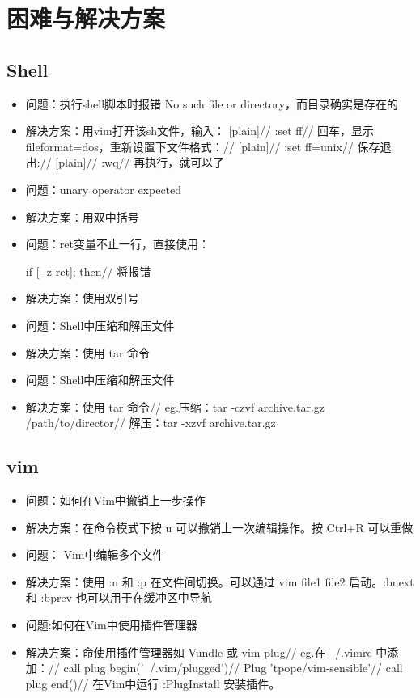 \documentclass[UTF8]{ctexart}
\begin{document}
  \section{困难与解决方案}
  \subsection{Shell}
\begin{itemize}
\item 问题：执行shell脚本时报错 No such file or directory，而目录确实是存在的
\item 解决方案：用vim打开该sh文件，输入：
[plain]//
:set ff//
回车，显示fileformat=dos，重新设置下文件格式：//
[plain]//
:set ff=unix//
保存退出://
[plain]//
:wq//
再执行，就可以了

\item 问题：unary operator expected
\item 解决方案：用双中括号

\item 问题：ret变量不止一行，直接使用：

if [ -z ret]; then//
将报错
\item 解决方案：使用双引号



\item 问题：Shell中压缩和解压文件

\item 解决方案：使用 tar 命令

\item 问题：Shell中压缩和解压文件

\item 解决方案：使用 tar 命令//
eg.压缩：tar -czvf archive.tar.gz /path/to/director//
解压：tar -xzvf archive.tar.gz
 \end{itemize}


\subsection{vim}
\begin{itemize}
\item 问题：如何在Vim中撤销上一步操作
\item 解决方案：在命令模式下按 u 可以撤销上一次编辑操作。按 Ctrl+R 可以重做


\item 问题： Vim中编辑多个文件
\item 解决方案：使用 :n 和 :p 在文件间切换。可以通过 vim file1 file2 启动。:bnext 和 :bprev 也可以用于在缓冲区中导航

\item 问题:如何在Vim中使用插件管理器
\item 解决方案：命使用插件管理器如 Vundle 或 vim-plug//
eg.在 ~/.vimrc 中添加：//
call plug begin('~/.vim/plugged')//
Plug 'tpope/vim-sensible'//
call plug end()//
在Vim中运行 :PlugInstall 安装插件。

 \end{itemize}
\end{document}
